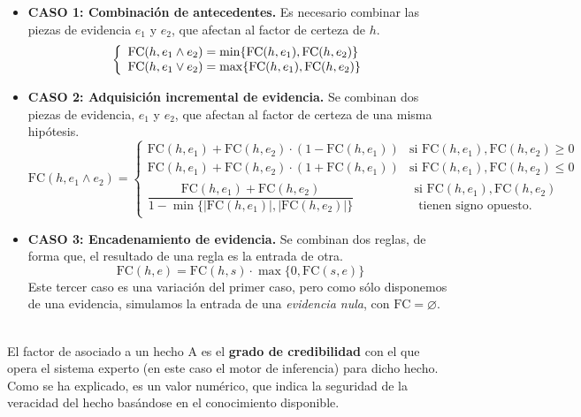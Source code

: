 \documentclass[a4paper,11pt, includehead]{article}
\begin{document}
\begin{itemize}
	\item \textbf{CASO 1: Combinación de antecedentes.}
	Es necesario combinar las piezas de evidencia $e_1$ y $e_2$, que afectan al factor de certeza de $h$.  
	$$
	\left\{ 
	\begin{array}{l}
		\text{FC}(h, e_1 \land e_2) = \min\{\text{FC}(h, e_1), \text{FC}(h, e_2)\} \cr
		\text{FC}(h, e_1 \lor e_2) = \max\{\text{FC}(h, e_1), \text{FC}(h, e_2)\}
	\end{array} 
	\right.
	$$
	\vspace{1ex}
	\item \textbf{CASO 2: Adquisición incremental de evidencia.} Se combinan dos piezas de evidencia, $e_1$ y $e_2$, que afectan al factor de certeza de una misma hipótesis.
	$$\text{FC}(h, e_1\land e_2)=
	\left\{ 
	\begin{array}{lr}
	\text{FC}(h, e_1) + \text{FC}(h, e_2) \cdot (1 - \text{FC}(h, e_1)) & \text{si } \text{FC}(h, e_1), \text{FC}(h, e_2) \geq 0 \\[1ex]
	\text{FC}(h, e_1) + \text{FC}(h, e_2) \cdot (1 + \text{FC}(h, e_1)) & \text{si } \text{FC}(h, e_1), \text{FC}(h, e_2) \leq 0 \\[1ex]
	\dfrac{\text{FC}(h, e_1) + \text{FC}(h, e_2)}{1 - \min\{ |\text{FC}(h, e_1)|, |\text{FC}(h, e_2)| \}} & 
	\begin{array}{l}
		\text{si } \text{FC}(h, e_1), \text{FC}(h, e_2)  \\
		\text{ tienen signo opuesto.}
		\end{array}
	\end{array}
	\right.
	$$
	\vspace{1ex}
	\item \textbf{CASO 3: Encadenamiento de evidencia.} Se combinan dos reglas, de forma que, el resultado	de una regla es la entrada de otra.
	$$
	\text{FC}(h, e) = \text{FC}(h, s) \cdot \max\{0, \text{FC}(s, e)\}
	$$
	Este tercer caso es una variación del primer caso, pero como sólo disponemos de una evidencia, simulamos la entrada de una \textit{evidencia nula}, con $\text{FC}=\varnothing$.
\end{itemize}

\vspace{2ex}

\\

El factor de asociado a un hecho A es el \textbf{grado de credibilidad} con el que opera el sistema experto (en este caso el motor de inferencia) para dicho hecho. Como se ha explicado, es un valor numérico, que indica la seguridad de la veracidad del hecho basándose en el conocimiento disponible.\\
\end{document}
